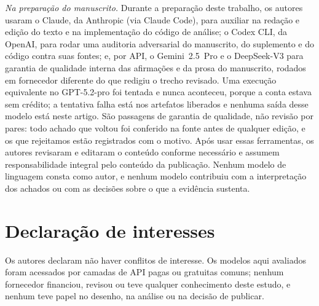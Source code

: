 \documentclass[11pt,a4paper]{article}
\begin{document}
\emph{Na preparação do manuscrito.} Durante a preparação deste trabalho, os
autores usaram o Claude, da Anthropic (via Claude Code), para auxiliar na redação
e edição do texto e na implementação do código de análise; o Codex CLI, da
OpenAI, para rodar uma auditoria adversarial do manuscrito, do suplemento e do
código contra suas fontes; e, por API, o Gemini~2.5~Pro e o DeepSeek-V3 para
garantia de qualidade interna das afirmações e da prosa do manuscrito, rodados em
fornecedor diferente do que redigiu o trecho revisado. Uma execução equivalente
no GPT-5.2-pro foi tentada e nunca aconteceu, porque a conta estava sem crédito;
a tentativa falha está nos artefatos liberados e nenhuma saída desse modelo está
neste artigo. São passagens de garantia de qualidade, não revisão por pares: todo
achado que voltou foi conferido na fonte antes de qualquer edição, e os que
rejeitamos estão registrados com o motivo. Após
usar essas ferramentas, os autores
revisaram e editaram o conteúdo conforme necessário e assumem responsabilidade
integral pelo conteúdo da publicação. Nenhum modelo de linguagem consta como
autor, e nenhum modelo contribuiu com a interpretação dos achados ou com as
decisões sobre o que a evidência sustenta.

\section*{Declaração de interesses}

Os autores declaram não haver conflitos de interesse. Os modelos aqui avaliados
foram acessados por camadas de API pagas ou gratuitas comuns; nenhum fornecedor
financiou, revisou ou teve qualquer conhecimento deste estudo, e nenhum teve
papel no desenho, na análise ou na decisão de publicar.


\end{document}
